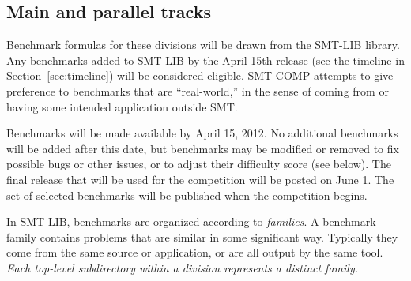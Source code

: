 \documentclass[12pt]{article}
\begin{document}
\subsection{Main and parallel tracks}

Benchmark formulas for these divisions
will be drawn from the SMT-LIB library.  Any benchmarks added to
SMT-LIB by the April 15th release (see the timeline in
Section~\ref{sec:timeline}) will be considered eligible.  SMT-COMP
attempts to give preference to benchmarks that are ``real-world,'' in
the sense of coming from or having some intended application outside
SMT.

Benchmarks will be made available by April 15, 2012.
No additional
benchmarks will be added after this date, but benchmarks may be
modified or removed to fix possible bugs or other issues, or to adjust their difficulty score (see below). 
The final release that will be used for the competition will be posted on June
1. The set of selected benchmarks will be published when the
competition begins.

In SMT-LIB, benchmarks are organized according to \emph{families}.  A benchmark
family contains problems that are similar in some significant way.  Typically
they come from the same source or application, or are all output by the same
tool.  \emph{Each top-level subdirectory within a division represents a distinct
family.}  
%
\end{document}
